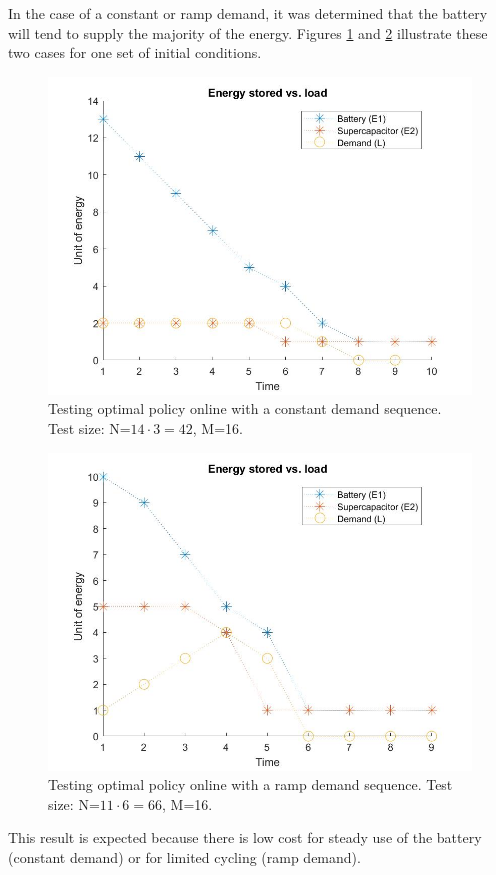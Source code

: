 \documentclass[conference]{IEEEtran}
\begin{document}
In the case of a constant or ramp demand, it was determined that the battery will tend to supply the majority of the energy. Figures \ref{fig:ConstDemand} and \ref{fig:RampDemand} illustrate these two cases for one set of initial conditions.
\begin{figure}[htbp]
\centerline{\includegraphics[scale=0.2]{EnergyStoredvsload_ConstantLoad(E1_max=13,E2_max=2).jpg}}
\caption{Testing optimal policy online with a constant demand sequence. Test size: N=$14\cdot3=42$, M=16.}
\label{fig:ConstDemand}
\end{figure}
\begin{figure}[htbp]
\centerline{\includegraphics[scale=0.2]{EnergyStoredvsload_RampLoad(E1_max=10,E2_max=5).jpg}}
\caption{Testing optimal policy online with a ramp demand sequence. Test size: N=$11\cdot6=66$, M=16.}
\label{fig:RampDemand}
\end{figure} This result is expected because there is low cost for steady use of the battery (constant demand) or for limited cycling (ramp demand).
\end{document}

